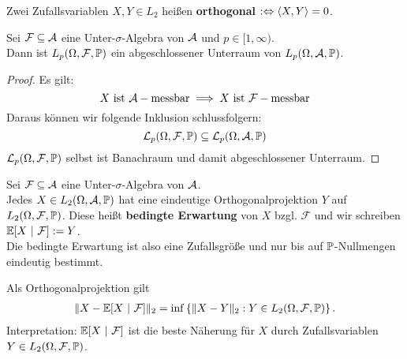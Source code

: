 \begin{bemerkung}
Zwei Zufallsvariablen $X,Y\in L_2$ heißen \textbf{orthogonal} $:\gdw\langle X,Y\rangle=0$.
\end{bemerkung}

\begin{proposition}
Sei $\mathcal{F}\subseteq\A$ eine Unter-$\sigma$-Algebra von $\A$ und $p\in[1,\infty)$.\\
Dann ist $L_p(\Omega,\mathcal{F},\P)$ ein abgeschlossener Unterraum von $L_p(\Omega,\A,\P)$.

\end{proposition}

\begin{proof}
	Es gilt:
	\[ X \text{ ist } \A-\text{messbar} \implies X \text{ ist } \F-\text{messbar}\]
	Daraus können wir folgende Inklusion schlussfolgern:
	\[\mathcal{L}_p(\Omega,\F,\P) \subseteq \mathcal{L}_p(\Omega,\A,\P)\]
	$\mathcal{L}_p(\Omega,\F,\P)$ selbst ist Banachraum und damit abgeschlossener Unterraum.
\end{proof}

\begin{defi}\enter
Sei $\mathcal{F}\subseteq\A$ eine Unter-$\sigma$-Algebra von $\A$.\\
Jedes $X\in L_2(\Omega,\mathcal{A},\P)$ hat eine eindeutige Orthogonalprojektion $Y$ auf $L_2(\Omega,\mathcal{F},\P)$. Diese heißt \textbf{bedingte Erwartung} von $X$ bzgl. $\mathcal{F}$ und wir schreiben $\E[X~|~\mathcal{F}]:=Y$.\\
Die bedingte Erwartung ist also eine Zufallsgröße und nur bis auf $\P$-Nullmengen eindeutig bestimmt.
\end{defi}

\begin{bemerkung}
Als Orthogonalprojektion gilt
\begin{align*}
\Vert X-\E[X~|~\mathcal{F}]\Vert_2=\inf\left\lbrace\Vert X-Y\Vert_2:Y\in L_2(\Omega,\mathcal{F},\P)\right\rbrace.
\end{align*}
Interpretation: $\E[X~|~\mathcal{F}]$ ist die beste Näherung für $X$ durch Zufallsvariablen\\ $Y\in L_2(\Omega,\mathcal{F},\P)$.
\end{bemerkung}

